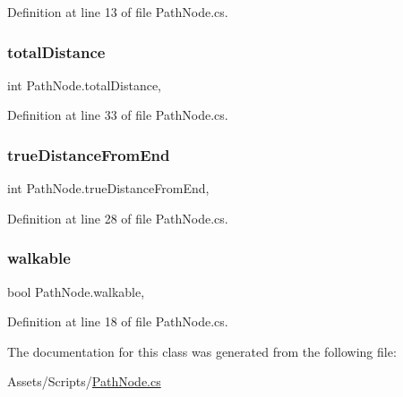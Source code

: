 Definition at line 13 of file Path\+Node.\+cs.

\mbox{\label{class_path_node_abb1849c6d76a35af78dd4fa84e1b7d3c}} 
\subsubsection{\texorpdfstring{totalDistance}{totalDistance}}
{\footnotesize\ttfamily int Path\+Node.\+total\+Distance\hspace{0.3cm}{\ttfamily [get]}, {\ttfamily [set]}}



Definition at line 33 of file Path\+Node.\+cs.

\mbox{\label{class_path_node_a94623e99b6e76db825843d7fbfd57ef9}} 
\subsubsection{\texorpdfstring{trueDistanceFromEnd}{trueDistanceFromEnd}}
{\footnotesize\ttfamily int Path\+Node.\+true\+Distance\+From\+End\hspace{0.3cm}{\ttfamily [get]}, {\ttfamily [set]}}



Definition at line 28 of file Path\+Node.\+cs.

\mbox{\label{class_path_node_a954f777fd998af56c4acc5f78cbf41ca}} 
\subsubsection{\texorpdfstring{walkable}{walkable}}
{\footnotesize\ttfamily bool Path\+Node.\+walkable\hspace{0.3cm}{\ttfamily [get]}, {\ttfamily [set]}}



Definition at line 18 of file Path\+Node.\+cs.



The documentation for this class was generated from the following file\+:\begin{DoxyCompactItemize}
\item 
Assets/\+Scripts/\mbox{\hyperlink{_path_node_8cs}{Path\+Node.\+cs}}\end{DoxyCompactItemize}
